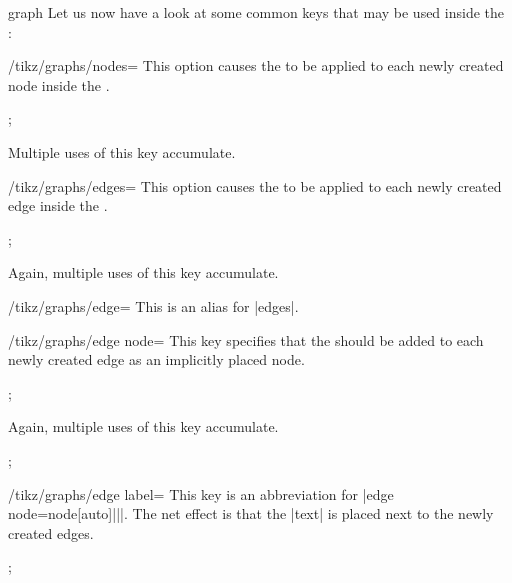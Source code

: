 \begin{pathoperation}{graph}{}
    Let us now have a look at some common keys that may be used inside the
    :
    \begin{key}{/tikz/graphs/nodes=}
        This option causes the  to be applied to each newly
        created node inside the .
\begin{codeexample}[preamble={\usetikzlibrary{graphs}}]
\tikz {};
\end{codeexample}
        Multiple uses of this key accumulate.
    \end{key}
    \begin{key}{/tikz/graphs/edges=}
        This option causes the  to be applied to each newly
        created edge inside the .
\begin{codeexample}[preamble={\usetikzlibrary{graphs}}]
\tikz {};
\end{codeexample}
        Again, multiple uses of this key accumulate.
    \end{key}
    \begin{key}{/tikz/graphs/edge=}
        This is an alias for |edges|.
    \end{key}

    \begin{key}{/tikz/graphs/edge node=}
        This key specifies that the  should be added
        to each newly created edge as an implicitly placed node.
\begin{codeexample}[preamble={\usetikzlibrary{graphs}}]
\tikz {};
\end{codeexample}
        Again, multiple uses of this key accumulate.
\begin{codeexample}[preamble={\usetikzlibrary{graphs}}]
\tikz {};
\end{codeexample}
    \end{key}

    \begin{key}{/tikz/graphs/edge label=}
        This key is an abbreviation for |edge node=node[auto]{||}|.
        The net effect is that the |text| is placed next to the newly created
        edges.
\begin{codeexample}[preamble={\usetikzlibrary{graphs}}]
\tikz {};
\end{codeexample}
    \end{key}


\end{pathoperation}
